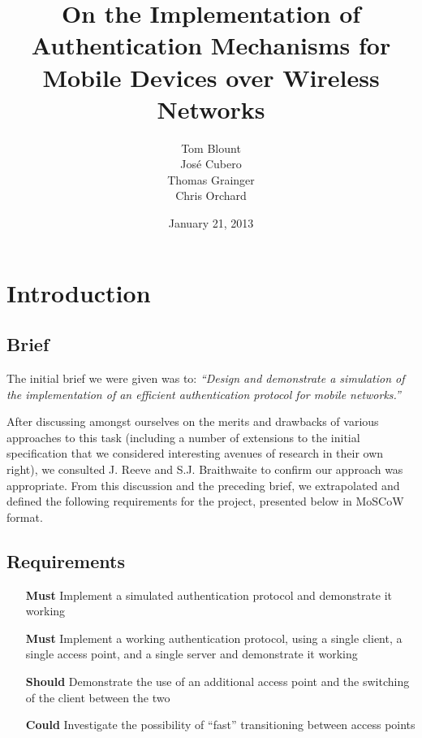 \documentclass[12pt,a4paper,titlepage]{article}
\author{Tom Blount\\José Cubero\\Thomas Grainger\\Chris Orchard}
\date{January 21, 2013}
\title{On the Implementation of Authentication Mechanisms for Mobile Devices over Wireless Networks}
\begin{document}
\maketitle

\tableofcontents
\newpage

\section{Introduction}

\subsection{Brief}
The initial brief we were given was to: 
\textit{{\quote ``Design and demonstrate a simulation of the implementation of an efficient authentication protocol for mobile networks.''}}

After discussing amongst ourselves on the merits and drawbacks of various approaches to this task (including a number of extensions to the initial specification that we considered interesting avenues of research in their own right), we consulted J. Reeve and S.J. Braithwaite to confirm our approach was appropriate. From this discussion and the preceding brief, we extrapolated and defined the following requirements for the project, presented below in MoSCoW format.

\subsection{Requirements}
\begin{itemize}
\item[\textbf{Must}] Implement a simulated authentication protocol and demonstrate it working
\item[\textbf{Must}] Implement a working authentication protocol, using a single client, a single access point, and a single server and demonstrate it working
\item[\textbf{Should}] Demonstrate the use of an additional access point and the switching of the client between the two
\item[\textbf{Could}] Investigate the possibility of ``fast'' transitioning between access points
\end{itemize}
\end{document}
